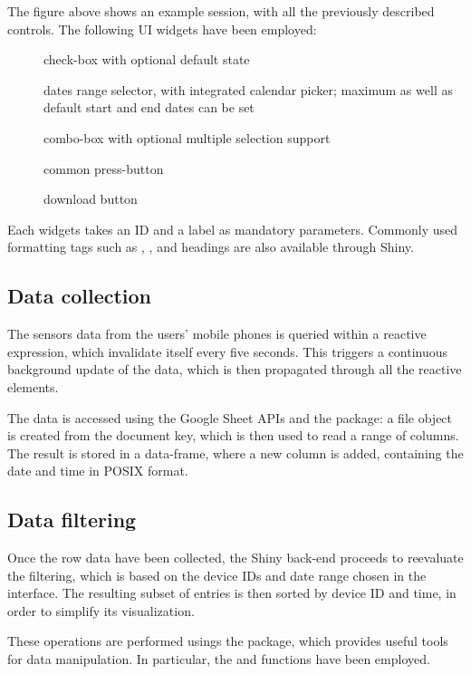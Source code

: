 
The figure above shows an example session, with all the previously described controls.
The following UI widgets have been employed:

\begin{description}
	\item[] check-box with optional default state
	\item[] dates range selector, with integrated calendar picker; maximum as well as default start and end dates can be set
	\item[] combo-box with optional multiple selection support
	\item[] common press-button
	\item[] download button
\end{description}

Each widgets takes an ID and a label as mandatory parameters.
Commonly used formatting tags such as , , and  headings are also available through Shiny.


\subsection{Data collection}
The sensors data from the users' mobile phones is queried within a reactive expression, which invalidate itself every five seconds.
This triggers a continuous background update of the data, which is then propagated through all the reactive elements.

The data is accessed using the Google Sheet APIs and the  package: a file object is created from the document key, which is then used to read a range of columns.
The result is stored in a data-frame, where a new column is added, containing the date and time in POSIX format.


\subsection{Data filtering}
Once the row data have been collected, the Shiny back-end proceeds to reevaluate the filtering, which is based on the device IDs and date range chosen in the interface.
The resulting subset of entries is then sorted by device ID and time, in order to simplify its visualization.

These operations are performed usings the  package, which provides useful tools for data manipulation.
In particular, the  and  functions have been employed.


